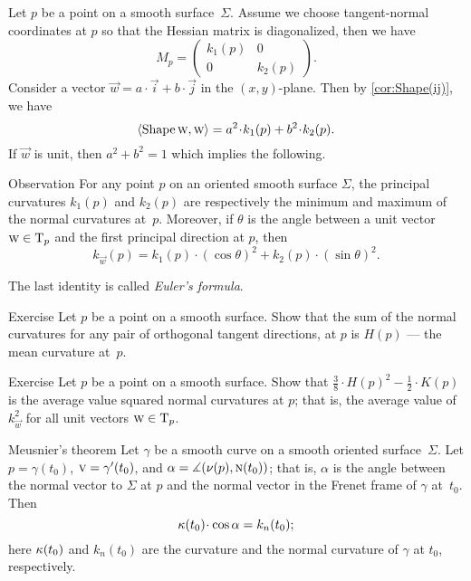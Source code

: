 Let $p$ be a point on a smooth surface~$\Sigma$.
Assume we choose tangent-normal coordinates at $p$ so that the Hessian matrix is diagonalized, then we have
\[M_p=\begin{pmatrix}
 k_1(p)
 &0
 \\
 0
 &k_2(p)
 \end{pmatrix}.
\]
Consider a vector ${\vec w}=a\cdot\vec i+b\cdot\vec j$ in the $(x,y)$-plane.
Then by \ref{cor:Shape(ij)}, we have
\[
\langle \Shape\vec w,\vec w\rangle
=a^2\cdot k_1(p) +b^2\cdot k_2(p). 
\]
If ${\vec w}$ is unit, then $a^2+b^2=1$ which implies the following.

\begin{thm}{Observation}\label{obs:k1-k2}
For any point $p$ on an oriented smooth surface $\Sigma$,
the principal curvatures $k_1(p)$ and $k_2(p)$ are respectively the minimum and maximum of the normal curvatures at~$p$.
Moreover, if $\theta$ is the angle between a unit vector ${\text{\sc{w}}}\in\mathrm{T}_p$ and the first principal direction at $p$, then 
\[k_{\vec w}(p)=k_1(p)\cdot(\cos\theta)^2+k_2(p)\cdot(\sin\theta)^2.\]

\end{thm}

The last identity is called \emph{Euler's formula}.

\begin{thm}{Exercise}\label{ex:mean-curvature}
Let $p$ be a point on a smooth surface.
Show that the sum of the normal curvatures for any pair of orthogonal tangent directions, at $p$ is $H(p)$ --- the mean curvature at~$p$. 
\end{thm}

\begin{thm}{Exercise}\label{ex:average}
Let $p$ be a point on a smooth surface.
Show that $\tfrac38\cdot H(p)^2-\tfrac12\cdot K(p)$ is the average value squared normal curvatures at $p$;
that is, the average value of $k_{\vec w}^2$ for all unit vectors ${\text{\sc{w}}}\in\mathrm{T}_p$.
\end{thm}



\begin{thm}{Meusnier's theorem}
\label{thm:meusnier}
Let $\gamma$ be a smooth curve on a smooth oriented surface~$\Sigma$.
Let $p=\gamma(t_0)$, ${\vec v}\z=\gamma'(t_0)$, and $\alpha\z=\measuredangle(\Norm(p),\norm(t_0))$;
that is, $\alpha$ is the angle between the normal vector to $\Sigma$ at $p$ and the normal vector in the Frenet frame of $\gamma$ at~$t_0$.
Then 
\[\kur(t_0)\cdot\cos\alpha=k_{n}(t_0);\]
here $\kappa(t_0)$ and $k_n(t_0)$ are the curvature and the normal curvature of $\gamma$ at $t_0$, respectively. 
\end{thm}


